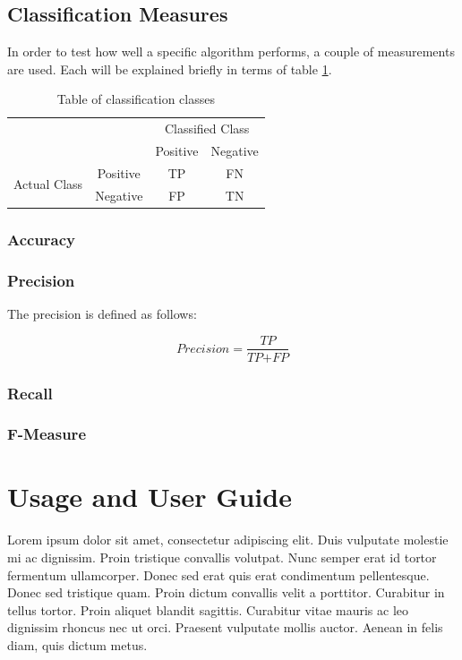 \documentclass[11pt]{article}
\begin{document}
\subsection{Classification Measures}

In order to test how well a specific algorithm performs, a couple of measurements are used. Each will be explained briefly in terms of table \ref{classification}.

\begin{table}[h]
\center
\begin{tabular}{cc|c|c|}
\cline{3-4}
& & \multicolumn{2}{|c|}{Classified Class} \\ \cline{3-4}
& &  Positive & Negative \\ \cline{1-4}
\multicolumn{1}{|c|}{\multirow{2}{*}{Actual Class}} &
\multicolumn{1}{|c|}{Positive} &  TP & FN      \\ \cline{2-4}
\multicolumn{1}{|c|}{}                        &
\multicolumn{1}{|c|}{Negative} & FP & TN     \\ \cline{1-4}
\end{tabular}
\caption{Table of classification classes}
\label{classification}
\end{table} 


\subsubsection{Accuracy}

\subsubsection{Precision}

The precision is defined as follows:

\begin{equation*}
\textit{Precision} = \frac{ \textit{TP}}{\textit{TP} + \textit{FP}}
\end{equation*}

\subsubsection{Recall}

\subsubsection{F-Measure}



\section{Usage and User Guide}
Lorem ipsum dolor sit amet, consectetur adipiscing elit. Duis vulputate molestie mi ac dignissim. Proin tristique convallis volutpat. Nunc semper erat id tortor fermentum ullamcorper. Donec sed erat quis erat condimentum pellentesque. Donec sed tristique quam. Proin dictum convallis velit a porttitor. Curabitur in tellus tortor. Proin aliquet blandit sagittis. Curabitur vitae mauris ac leo dignissim rhoncus nec ut orci. Praesent vulputate mollis auctor. Aenean in felis diam, quis dictum metus.
\end{document}
